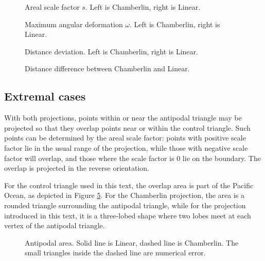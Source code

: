 \documentclass{amsart}[12pt]
\begin{document}
\begin{figure}%

\caption{Areal scale factor $s$. Left is Chamberlin, right is Linear.}
\label{fig:scale}
\end{figure}

\begin{figure}%

\caption{Maximum angular deformation $\omega$. Left is Chamberlin, right is Linear.}
\label{fig:angle}
\end{figure}

\begin{figure}%

\caption{Distance deviation. Left is Chamberlin, right is Linear.}
\label{fig:distance}
\end{figure}

\begin{figure}%

\caption{Distance difference between Chamberlin and Linear.}
\label{fig:distance}
\end{figure}

\subsection{Extremal cases}
With both projections, points within or near the antipodal triangle may be
projected so that they overlap points near or within the control triangle. Such
points can be determined by the areal scale factor: points with positive scale
factor lie in the usual range of the projection, while those with negative scale
factor will overlap, and those where the scale factor is 0 lie on the boundary.
The overlap is projected in the reverse orientation.

For the control triangle used in this text, the overlap area is part of the
Pacific Ocean, as depicted in Figure \ref{fig:antipodal}. For the Chamberlin
projection, the area is a rounded triangle surrounding the antipodal triangle,
while for the projection introduced in this text, it is a three-lobed shape
where two lobes meet at each vertex of the antipodal triangle.

\begin{figure}%

\caption{Antipodal area. Solid line is Linear, dashed line is Chamberlin. The
small triangles inside the dashed line are numerical error.}
\label{fig:antipodal}
\end{figure}
\end{document}
